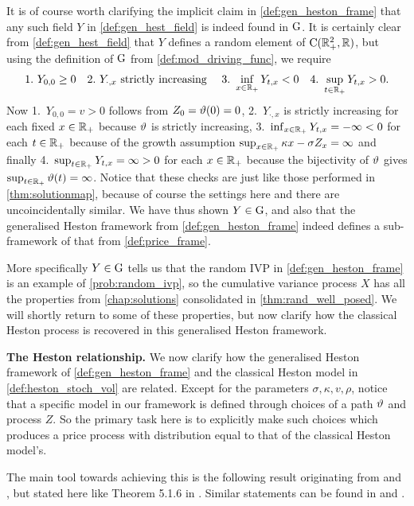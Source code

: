 It is of course worth clarifying the implicit claim in \autoref{def:gen_heston_frame} that any such field $Y$ in \autoref{def:gen_hest_field} is indeed found in $\mathrm{G}$. It is certainly clear from \autoref{def:gen_hest_field} that $Y$ defines a random element of $\mathrm{C}(\mathbb{R}^2_+,\mathbb{R})$, but using the definition of $\mathrm{G}$ from \autoref{def:mod_driving_func}, we require~
\begin{equation}
    1.~Y_{0,0}\ge 0\quad 2.~Y_{\cdot,x} \text{ strictly increasing }\quad 3.~\inf_{x\in\mathbb{R}_+}Y_{t,x}<0\quad 4.~\sup_{t\in\mathbb{R}_+}Y_{t,x}>0.
\end{equation}
Now 1.~$Y_{0,0} =v >0$ follows from $Z_0=\vartheta(0)=0$, 2.~$Y_{\cdot,x}$ is strictly increasing for each fixed $x\in\mathbb{R}_+$ because $\vartheta$ is strictly increasing, 3.~$\inf_{x\in\mathbb{R}_+}Y_{t,x}=-\infty<0$ for each $t\in\mathbb{R}_+$ because of the growth assumption $\sup_{x\in\mathbb{R}_+}\kappa x - \sigma Z_x=\infty$ and finally 4.~$\sup_{t\in\mathbb{R}_+}Y_{t,x}=\infty>0$ for each $x\in\mathbb{R}_+$ because the bijectivity of $\vartheta$ gives $\sup_{t\in\mathbb{R}_+}\vartheta(t)=\infty$. Notice that these checks are just like those performed in \autoref{thm:solutionmap}, because of course the settings here and there are uncoincidentally similar. We have thus shown $Y\in\mathrm{G}$, and also that the generalised Heston framework from \autoref{def:gen_heston_frame} indeed defines a sub-framework of that from \autoref{def:price_frame}.

More specifically $Y\in\mathrm{G}$ tells us that the random IVP in \autoref{def:gen_heston_frame} is an example of \autoref{prob:random_ivp}, so the cumulative variance process $X$ has all the properties from \autoref{chap:solutions} consolidated in \autoref{thm:rand_well_posed}. We will shortly return to some of these properties, but now clarify how the classical Heston process is recovered in this generalised Heston framework.

\vspace{3mm}\textbf{The Heston relationship.} We now clarify how the generalised Heston framework of \autoref{def:gen_heston_frame} and the classical Heston model in \autoref{def:heston_stoch_vol} are related. Except for the parameters $\sigma,\kappa,v,\rho$, notice that a specific model in our framework is defined through choices of a path $\vartheta$ and process $Z$. So the primary task here is to explicitly make such choices which produces a price process with distribution equal to that of the classical Heston model's.

The main tool towards achieving this is the following result originating from \cite{dambis_1965} and \cite{dubins_1965}, but stated here like Theorem 5.1.6 in \cite{revuz_1999}. Similar statements can be found in \cite{karatzas_1998} and \cite{ikeda_1989}.

